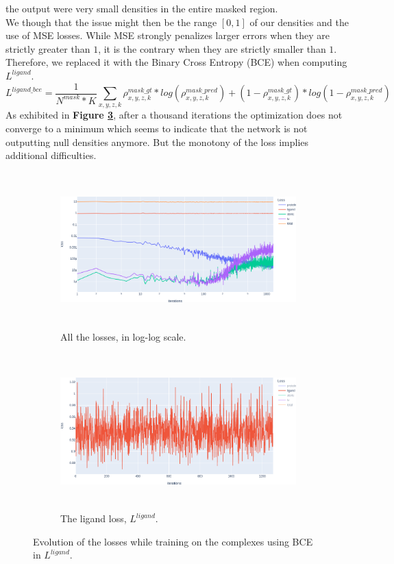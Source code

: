 \documentclass{article}
\begin{document}
the output were very small densities in the entire masked region. \\
We though that the issue might then be the range $[0,1]$ of our densities and the use of MSE losses. While MSE strongly penalizes larger errors when they are strictly greater than $1$, it is the contrary when they are strictly smaller than $1$. Therefore, we replaced it with the Binary Cross Entropy (BCE) when computing $L^{ligand}$. 
$$
L^{ligand\_bce} = \frac{1}{N^{mask}*K} \sum_{x,y,z,k} \rho_{x,y,z,k}^{mask\_gt} * log(\rho_{x,y,z,k}^{mask\_pred}) + (1-\rho_{x,y,z,k}^{mask\_gt}) * log(1-\rho_{x,y,z,k}^{mask\_pred})
$$
As exhibited in \textbf{Figure \ref{fig:loss_complex-bce}}, after a thousand iterations the optimization does not converge to a minimum which seems to indicate that the network is not outputting null densities anymore. But the monotony of the loss implies additional difficulties. \\
\begin{figure}[H]
    \centering
    \begin{subfigure}{.5\textwidth}
        \centering
        \includegraphics[height=6cm,width=\textwidth,keepaspectratio]{loss_complex-bce-all.png}
        \caption{All the losses, in log-log scale.}
        \label{fig:loss_complex-bce-all}
    \end{subfigure}%
    \begin{subfigure}{.5\textwidth}
        \centering
        \includegraphics[height=6cm,width=\textwidth,keepaspectratio]{loss_complex-bce-lig.png}
        \caption{The ligand loss, $L^{ligand}$.}
        \label{fig:loss_complex-bce-lig}
    \end{subfigure}
    \caption{Evolution of the losses while training on the complexes using BCE in $L^{ligand}$.}
    \label{fig:loss_complex-bce}
\end{figure}
\end{document}
